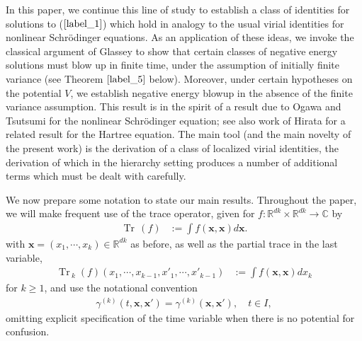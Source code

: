 \documentclass[reqno]{amsart}
\numberwithin{equation}{section}
\theoremstyle{remark}
\DeclareMathOperator{\Tr}{Tr\,}
\begin{document}
In this paper, we continue this line of study to establish a class of identities for solutions to ($\ref{label_1}$) which hold in analogy to the usual virial identities for nonlinear Schr\"odinger equations.  As an application of these ideas, we invoke the classical argument of Glassey \cite{G} to show that certain classes of negative energy solutions must blow up in finite time, under the assumption of initially finite variance (see Theorem $\ref{label_5}$ below).  Moreover, under certain hypotheses on the potential $V$, we establish negative energy blowup in the absence of the finite variance assumption.  This result is in the spirit of a result due to Ogawa and Tsutsumi \cite{OT} for the nonlinear Schr\"odinger equation; see also work of Hirata \cite{H} for a related result for the Hartree equation.  The main tool (and the main novelty of the present work) is the derivation of a class of localized virial identities, the derivation of which in the hierarchy setting produces a number of additional terms which must be dealt with carefully.

\vspace{0.2in}

We now prepare some notation to state our main results.  Throughout the paper, we will make frequent use of the trace operator, given for $f:\mathbb{R}^{dk}\times\mathbb{R}^{dk}\rightarrow \mathbb{C}$ by
\begin{align*}
\Tr(f)&:=\int f({\mathbf x},{\mathbf x})d{\mathbf x}.
\end{align*}
with ${\mathbf x}=(x_1,\cdots,x_k)\in\mathbb{R}^{dk}$ as before, as well as the partial trace in the last variable, 
\begin{align*}
\Tr_k(f)(x_1,\cdots,x_{k-1},x'_1,\cdots,x'_{k-1})&:=\int f({\mathbf x},{\mathbf x})dx_k
\end{align*}
for $k\geq 1$, and use the notational convention
\begin{align*}
\gamma^{(k)}(t,{\mathbf x},{\mathbf x}')=\gamma^{(k)}({\mathbf x},{\mathbf x}'),\quad t\in I,
\end{align*}
omitting explicit specification of the time variable when there is no potential for confusion.  

\vspace{0.2in}
\end{document}
